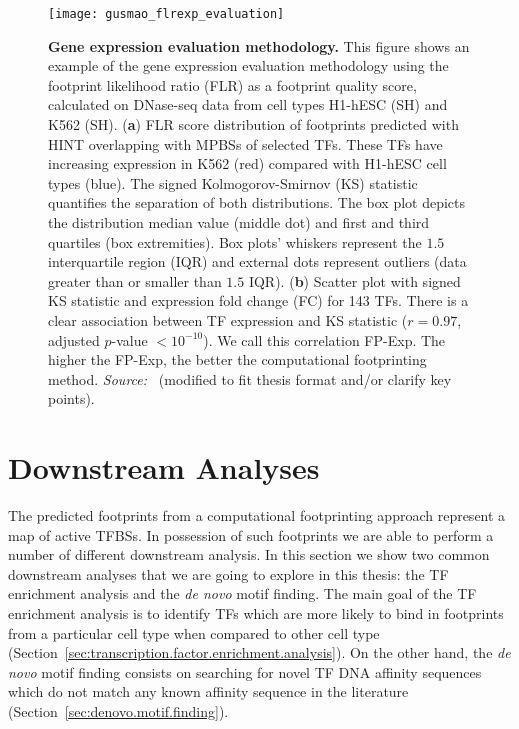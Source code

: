 \begin{figure}[h!]
\centering
\vspace{0.8cm}
\texttt{[image: gusmao\_flrexp\_evaluation]}
\vspace{0.1cm}
\caption[Gene expression evaluation methodology]{\textbf{Gene expression evaluation methodology.} This figure shows an example of the gene expression evaluation methodology using the footprint likelihood ratio (FLR) as a footprint quality score, calculated on DNase-seq data from cell types H1-hESC (SH) and K562 (SH). (\textbf{a}) FLR score distribution of footprints predicted with HINT overlapping with MPBSs of selected TFs. These TFs have increasing expression in K562 (red) compared with H1-hESC cell types (blue). The signed Kolmogorov-Smirnov (KS) statistic quantifies the separation of both distributions. The box plot depicts the distribution median value (middle dot) and first and third quartiles (box extremities). Box plots' whiskers represent the $1.5$ interquartile region (IQR) and external dots represent outliers (data greater than or smaller than $1.5$ IQR). (\textbf{b}) Scatter plot with signed KS statistic and expression fold change (FC) for 143 TFs. There is a clear association between TF expression and KS statistic ($r = 0.97$, adjusted $p$-value $< 10^{-10}$). We call this correlation FP-Exp. The higher the FP-Exp, the better the computational footprinting method. \emph{Source:~\cite{gusmao2016}} (modified to fit thesis format and/or clarify key points).}
\label{fig:gusmao_flrexp_evaluation}
\end{figure}

\section{Downstream Analyses}
\label{sec:footprint.downstream.analyses}

The predicted footprints from a computational footprinting approach represent a map of active TFBSs. In possession of such footprints we are able to perform a number of different downstream analysis. In this section we show two common downstream analyses that we are going to explore in this thesis: the TF enrichment analysis and the \emph{de novo} motif finding. The main goal of the TF enrichment analysis is to identify TFs which are more likely to bind in footprints from a particular cell type when compared to other cell type (Section~\ref{sec:transcription.factor.enrichment.analysis}). On the other hand, the \emph{de novo} motif finding consists on searching for novel TF DNA affinity sequences which do not match any known affinity sequence in the literature (Section~\ref{sec:denovo.motif.finding}).

